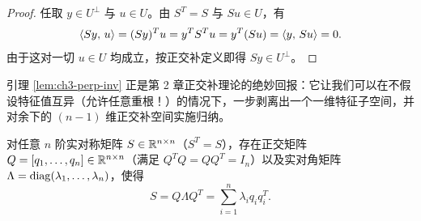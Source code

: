 \begin{proof}
任取 $y \in U^\perp$ 与 $u \in U$。由 $S^T = S$ 与 $Su \in U$，有
\[
  \left\langle Sy,\, u \right\rangle = (Sy)^T u = y^T S^T u = y^T (Su) = \left\langle y,\, Su \right\rangle = 0.
\]
由于这对一切 $u \in U$ 均成立，按正交补定义即得 $Sy \in U^\perp$。
\end{proof}

引理 \ref{lem:ch3-perp-inv} 正是第 2 章正交补理论的绝妙回报：它让我们可以在不假设特征值互异（允许任意重根！）的情况下，一步剥离出一个一维特征子空间，并对余下的 $(n-1)$ 维正交补空间实施归纳。

\begin{thmBox}
\begin{theorem}
\label{thm:ch3-spectral}
对任意 $n$ 阶实对称矩阵 $S \in \mathbb{R}^{n\times n}$（$S^T = S$），存在正交矩阵 $Q = [q_1,\dots,q_n] \in \mathbb{R}^{n\times n}$（满足 $Q^T Q = Q Q^T = I_n$）以及实对角矩阵 $\Lambda = \operatorname{diag}(\lambda_1,\dots,\lambda_n)$，使得
\begin{equation}
  S = Q \Lambda Q^T = \sum_{i=1}^n \lambda_i q_i q_i^T. \label{eq:ch3-spectral}
\end{equation}
\end{theorem}
\end{thmBox}

